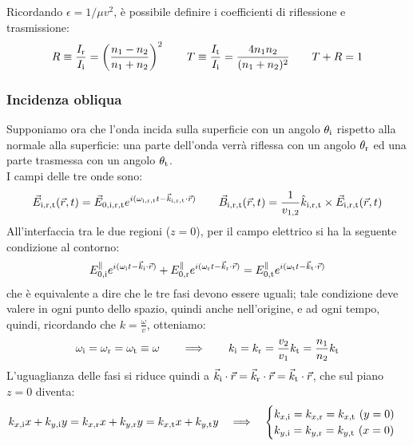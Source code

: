 Ricordando $ \epsilon = 1 / \mu v^2 $, è possibile definire i coefficienti di riflessione e trasmissione:
\begin{equation}
	R \equiv \frac{I_{\text{r}}}{I_{\text{i}}} = \left( \frac{n_1 - n_2}{n_1 + n_2} \right)^2 \qquad T \equiv \frac{I_{\text{t}}}{I_{\text{i}}} = \frac{4 n_1 n_2}{(n_1 + n_2)^2} \qquad T + R = 1
	\label{eq:59}
\end{equation}

\subsubsection{Incidenza obliqua}

Supponiamo ora che l'onda incida sulla superficie con un angolo $ \theta_{\text{i}} $ rispetto alla normale alla superficie: una parte dell'onda verrà riflessa con un angolo $ \theta_{\text{r}} $ ed una parte trasmessa con un angolo $ \theta_{\text{t}} $. \\ 
I campi delle tre onde sono:
\begin{equation}
	\vec{E}_{\text{i},\text{r},\text{t}}(\vec{r},t) = \vec{E}_{0,\text{i},\text{r},\text{t}} e^{i(\omega_{\text{i},\text{r},\text{t}} t - \vec{k}_{\text{i},\text{r},\text{t}} \cdot \vec{r})} \qquad \vec{B}_{\text{i},\text{r},\text{t}}(\vec{r},t) = \frac{1}{v_{1,2}} \hat{k}_{\text{i},\text{r},\text{t}} \times \vec{E}_{\text{i},\text{r},\text{t}}(\vec{r},t)
	\label{eq:60}
\end{equation}
All'interfaccia tra le due regioni ($ z = 0 $), per il campo elettrico si ha la seguente condizione al contorno:
\begin{equation}
	E^{\parallel}_{0,\text{i}} e^{i(\omega_{\text{i}} t - \vec{k}_{\text{i}} \cdot \vec{r})} + E^{\parallel}_{0,\text{r}} e^{i(\omega_{\text{r}} t - \vec{k}_{\text{r}} \cdot \vec{r})} = E^{\parallel}_{0,\text{t}} e^{i(\omega_{\text{t}} t - \vec{k}_{\text{t}} \cdot \vec{r})}
	\label{eq:61}
\end{equation}
che è equivalente a dire che le tre fasi devono essere uguali; tale condizione deve valere in ogni punto dello spazio, quindi anche nell'origine, e ad ogni tempo, quindi, ricordando che $ k = \frac{\omega}{v} $, otteniamo:
\begin{equation}
	\omega_{\text{i}} = \omega_{\text{r}} = \omega_{\text{t}} \equiv \omega \qquad\Longrightarrow\qquad k_{\text{i}} = k_{\text{r}} = \frac{v_2}{v_1} k_{\text{t}} = \frac{n_1}{n_2} k_{\text{t}}
	\label{eq:62}
\end{equation}
L'uguaglianza delle fasi si riduce quindi a $ \vec{k}_{\text{i}}\cdot\vec{r} = \vec{k}_{\text{r}}\cdot\vec{r} = \vec{k}_{\text{t}}\cdot\vec{r} $, che sul piano $ z = 0 $ diventa:
\begin{equation}
	k_{x,\text{i}} x + k_{y,\text{i}}  y = k_{x,\text{r}} x + k_{y,\text{r}} y = k_{x,\text{t}} x + k_{y,\text{t}} y \quad\Longrightarrow\quad
	\begin{cases}
		k_{x,\text{i}} = k_{x,\text{r}} = k_{x,\text{t}} \,\,(y = 0) \\ 
		k_{y,\text{i}} = k_{y,\text{r}} = k_{y,\text{t}} \,\,(x = 0)
	\end{cases}
	\label{eq:63}
\end{equation}
